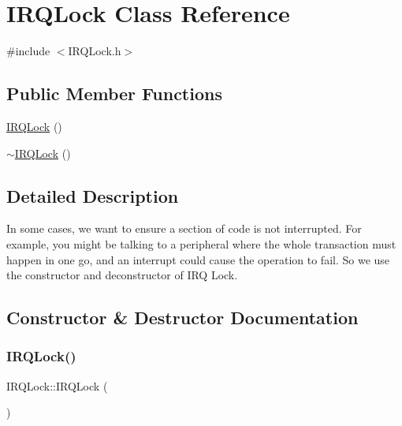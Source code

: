\hypertarget{class_i_r_q_lock}{}\section{I\+R\+Q\+Lock Class Reference}
\label{class_i_r_q_lock}


{\ttfamily \#include $<$I\+R\+Q\+Lock.\+h$>$}

\subsection*{Public Member Functions}
\begin{DoxyCompactItemize}
\item 
\hyperlink{class_i_r_q_lock_aa9ab20f118027e26c7748d0333a9581e}{I\+R\+Q\+Lock} ()
\item 
\hyperlink{class_i_r_q_lock_a77ab3c6555d123ef45e2e50e4eab81fb}{$\sim$\+I\+R\+Q\+Lock} ()
\end{DoxyCompactItemize}


\subsection{Detailed Description}
In some cases, we want to ensure a section of code is not interrupted. For example, you might be talking to a peripheral where the whole transaction must happen in one go, and an interrupt could cause the operation to fail. So we use the constructor and deconstructor of I\+RQ Lock. 

\subsection{Constructor \& Destructor Documentation}
\mbox{\label{class_i_r_q_lock_aa9ab20f118027e26c7748d0333a9581e}} 
\subsubsection{\texorpdfstring{I\+R\+Q\+Lock()}{IRQLock()}}
{\footnotesize\ttfamily I\+R\+Q\+Lock\+::\+I\+R\+Q\+Lock (\begin{DoxyParamCaption}{ }\end{DoxyParamCaption})\hspace{0.3cm}{\ttfamily [inline]}}

\mbox{\label{class_i_r_q_lock_a77ab3c6555d123ef45e2e50e4eab81fb}} 

